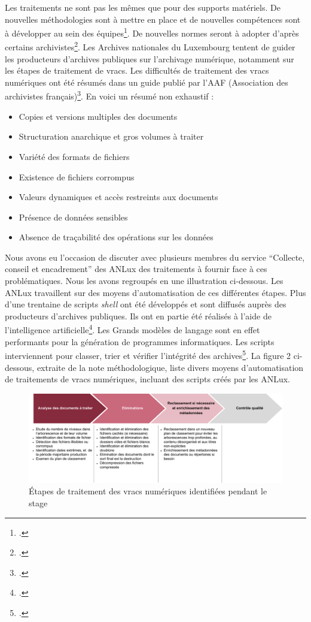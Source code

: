 Les traitements ne sont pas les mêmes que pour des supports matériels.
De nouvelles méthodologies sont à mettre en place et de nouvelles
compétences sont à développer au sein des équipes\footcite{noauthor_prise_nodate}. De nouvelles normes
seront à adopter d'après certains archivistes\footcite{rajotte_reflexion_2010}. Les
Archives nationales du Luxembourg tentent de guider les producteurs
d'archives publiques sur l'archivage numérique, notamment sur les étapes
de traitement de vracs. Les difficultés de traitement des vracs numériques ont été résumés dans un guide publié par l'AAF (Association des archivistes français)\footcite{bechard_archives_2020}. 
En voici un résumé non exhaustif :
\begin{itemize}
	\item Copies et versions multiples des documents
	\item Structuration anarchique et gros volumes à traiter
	\item Variété des formats de fichiers
	\item Existence de fichiers corrompus
	\item Valeurs dynamiques et accès restreints aux documents
	\item Présence de données sensibles
	\item Absence de traçabilité des opérations sur les données
\end{itemize}
Nous avons eu l'occasion de discuter avec plusieurs membres du service \enquote{Collecte, conseil et encadrement} des ANLux des traitements à fournir face à ces problématiques. Nous les avons regroupés en une illustration ci-dessous. Les ANLux travaillent sur des moyens d'automatisation de ces différentes
étapes. Plus d'une trentaine de scripts \emph{shell} ont été développés et
sont diffusés auprès des producteurs d'archives publiques. Ils ont en
partie été réalisés à l'aide de l'intelligence artificielle\footcite{IA_porte}. Les
Grands modèles de langage sont en effet performants pour la génération
de programmes informatiques. Les scripts interviennent pour classer, trier et vérifier l'intégrité des archives\footcite{IA_porte}. La figure 2 ci-dessous, extraite de la note
méthodologique, liste divers moyens d'automatisation de traitements de vracs numériques,
 incluant des scripts créés par les ANLux.

\begin{figure}[h!]
	\centerline{\includegraphics[width=\textwidth]{./media/image1.png}}
	\caption{Étapes de traitement des vracs numériques identifiées pendant le stage}
\end{figure}

